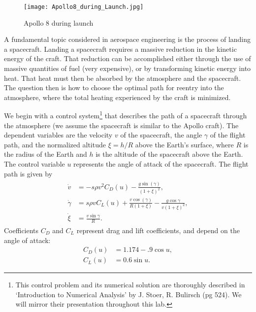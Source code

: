 \label{lab:reentry}

\begin{figure}
\centering
\texttt{[image: Apollo8\_during\_Launch.jpg]}
\caption{Apollo 8 during launch}
\label{fig:reentry:apollo8}
\end{figure}

A fundamental topic considered in aerospace engineering is the process of landing a spacecraft.
Landing a spacecraft requires a massive reduction in the kinetic energy of the craft.
That reduction can be accomplished either through the use of massive quantities of fuel (very expensive), or by  transforming kinetic energy into heat.
That heat must then be absorbed by the atmosphere and the spacecraft.
The question then is how to choose the optimal path for reentry into the atmosphere, where the total heating experienced by the craft is minimized.

We begin with a control system\footnote{This control problem and its numerical solution are thoroughly described in `Introduction to Numerical Analysis' by J. Stoer, R. Bulirsch (pg 524).
We will mirror their presentation throughout this lab.}
that describes the path of a spacecraft through the atmosphere
(we assume the spacecraft is similar to the Apollo craft).
The dependent variables are the velocity $v$ of the spacecraft,
the angle $\gamma$ of the flight path,
and the normalized altitude $\xi=h/R$ above the Earth's surface, where $R$ is the radius of the Earth and $h$ is the altitude of the spacecraft above the Earth.
The control variable  $u$ represents the angle of attack of the spacecraft.
The flight path is given by
\begin{align}
\begin{split}
\dot{v} &= -s\rho v^2C_D(u) - \frac{g\sin(\gamma)}{(1+\xi)^2},\\
\dot{\gamma} &= s \rho v C_L(u) + \frac{v \cos(\gamma)}{R(1+\xi)} - \frac{g \cos \gamma}{v(1+\xi)^2},\\
\dot{\xi} &= \frac{v \sin \gamma}{R}.
\end{split} \label{eqn:reentry:control_system}
\end{align}
Coefficients $C_D$ and $C_L$ represent drag and lift coefficients, and depend on the angle of attack:
\begin{align*}
 C_D(u) &= 1.174 - .9\cos u, \\
 C_L(u) &= 0.6\sin u.
\end{align*}

